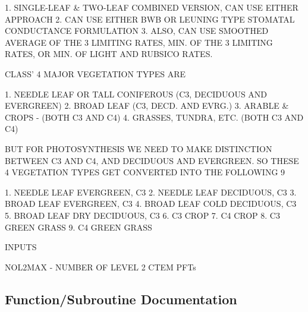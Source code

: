 \begin{DoxyVerb} 1.  SINGLE-LEAF & TWO-LEAF COMBINED VERSION, CAN USE EITHER APPROACH   
 2.  CAN USE EITHER BWB OR LEUNING TYPE STOMATAL CONDUCTANCE FORMULATION
 3.  ALSO, CAN USE SMOOTHED AVERAGE OF THE 3 LIMITING RATES, MIN. OF
     THE 3 LIMITING RATES, OR MIN. OF LIGHT AND RUBSICO RATES.

 CLASS' 4 MAJOR VEGETATION TYPES ARE

 1. NEEDLE LEAF OR TALL CONIFEROUS (C3, DECIDUOUS AND EVERGREEN)
 2. BROAD LEAF (C3, DECD. AND EVRG.)
 3. ARABLE & CROPS - (BOTH C3 AND C4)
 4. GRASSES, TUNDRA, ETC. (BOTH C3 AND C4)

 BUT FOR PHOTOSYNTHESIS WE NEED TO MAKE DISTINCTION BETWEEN C3 AND
 C4, AND DECIDUOUS AND EVERGREEN. SO THESE 4 VEGETATION TYPES GET
 CONVERTED INTO THE FOLLOWING 9

 1. NEEDLE LEAF EVERGREEN, C3
 2. NEEDLE LEAF DECIDUOUS, C3
 3. BROAD LEAF EVERGREEN, C3
 4. BROAD LEAF COLD DECIDUOUS, C3
 5. BROAD LEAF DRY DECIDUOUS, C3
 6. C3 CROP
 7. C4 CROP
 8. C3 GREEN GRASS
 9. C4 GREEN GRASS

 INPUTS

 NOL2MAX   - NUMBER OF LEVEL 2 CTEM PFTs\end{DoxyVerb}


\subsection{Function/\+Subroutine Documentation}
\hypertarget{PHTSYN3_8f_a9d3d9bffc5e2ae5e7d6411e23328f59c}{}

